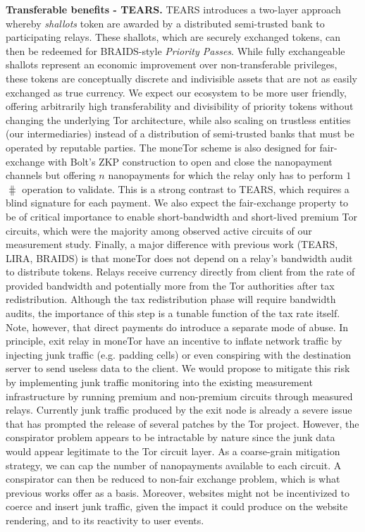 
\medskip\noindent\textbf{Transferable benefits - TEARS.}
  TEARS introduces a two-layer approach
whereby \emph{shallots} token are awarded by a distributed semi-trusted bank to
participating relays. These shallots, which are securely exchanged tokens, can
then be redeemed for BRAIDS-style \emph{Priority Passes}. While fully
exchangeable shallots represent an economic improvement over non-transferable
privileges, these tokens are conceptually discrete and indivisible assets that
are not as easily exchanged as true currency. We expect our ecosystem to be more
user friendly, offering arbitrarily high transferability and divisibility of
priority tokens without changing the underlying Tor architecture, while also
scaling on trustless entities (our intermediaries) instead of a distribution of
semi-trusted banks that must be operated by reputable parties. The moneTor
scheme is also designed for fair-exchange with Bolt's ZKP construction to open
and close the nanopayment channels but offering $n$ nanopayments for which the
relay only has to perform $1$ $\hash$ operation to validate. This is a strong
contrast to TEARS, which requires a blind signature for each payment. We also
expect the fair-exchange property to be of critical importance to enable
short-bandwidth and short-lived premium Tor circuits, which were the majority
among observed active circuits of our measurement study. Finally, a major
difference with previous work (TEARS, LIRA, BRAIDS) is that moneTor does not
depend on a relay's bandwidth audit to distribute tokens. Relays receive
currency directly from client from the rate of provided bandwidth and
potentially more from the Tor authorities after tax redistribution. Although the
tax redistribution phase will require bandwidth audits, the importance of this
step is a tunable function of the tax rate itself. Note, however, that direct
payments do introduce a separate mode of abuse. In principle, exit relay in
moneTor have an incentive to inflate network traffic by injecting junk traffic
(e.g. padding cells) or even conspiring with the destination server to send
useless data to the client. We would propose to mitigate this risk by
implementing junk traffic monitoring into the existing measurement
infrastructure by running premium and non-premium circuits through measured
relays. Currently junk traffic produced by the exit node is already a severe
issue~\cite{rochet2018dropping} that has prompted the release of several patches
by the Tor project. However, the conspirator problem appears to be intractable
by nature since the junk data would appear legitimate to the Tor circuit layer.
As a coarse-grain mitigation strategy, we can cap the number of nanopayments
available to each circuit. A conspirator can then be reduced to non-fair
exchange problem, which is what previous works offer as a basis. Moreover,
websites might not be incentivized to coerce and insert junk traffic, given the
impact it could produce on the website rendering, and to its reactivity to user
events.



